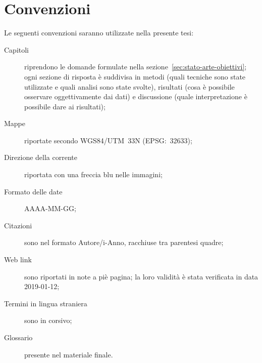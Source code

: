 \section{Convenzioni}
Le seguenti convenzioni saranno utilizzate nella presente tesi:
%
\begin{description}
	\item[Capitoli] riprendono le domande formulate nella sezione~\ref{sec:stato-arte-obiettivi}; ogni sezione di risposta è suddivisa in metodi (quali tecniche sono state utilizzate e quali analisi sono state svolte), risultati (cosa è possibile osservare oggettivamente dai dati) e discussione (quale interpretazione è possibile dare ai risultati);
	\item[Mappe] riportate secondo WGS84/UTM~33N (EPSG:~32633);
	\item[Direzione della corrente] riportata con una freccia blu nelle immagini;
	\item[Formato delle date] AAAA-MM-GG;
	\item[Citazioni] sono nel formato Autore/i-Anno, racchiuse tra parentesi quadre;
	\item[Web link] sono riportati in note a piè pagina; la loro validità è stata verificata in data 2019-01-12;
	\item[Termini in lingua straniera] sono in corsivo;
	\item[Glossario] presente nel materiale finale.
\end{description}
%
